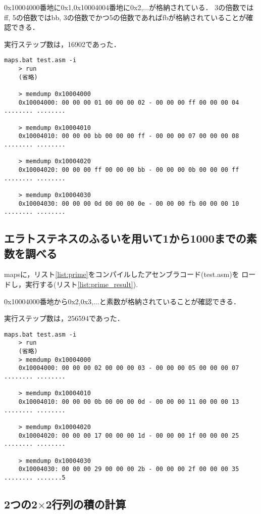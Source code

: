 \documentclass[11pt]{jarticle}
\begin{document}
0x10004000番地に0x1,0x10004004番地に0x2,...が格納されている．
3の倍数ではff, 5の倍数ではbb, 3の倍数でかつ5の倍数であればfbが格納されていることが確認できる．

実行ステップ数は，16902であった．

\begin{lstlisting}[caption=FizzBuzzの結果,label=list:fizzbuzz_result]
    maps.bat test.asm -i
    > run
    (省略)

    > memdump 0x10004000
    0x10004000: 00 00 00 01 00 00 00 02 - 00 00 00 ff 00 00 00 04  ........ ........

    > memdump 0x10004010
    0x10004010: 00 00 00 bb 00 00 00 ff - 00 00 00 07 00 00 00 08  ........ ........

    > memdump 0x10004020
    0x10004020: 00 00 00 ff 00 00 00 bb - 00 00 00 0b 00 00 00 ff  ........ ........

    > memdump 0x10004030
    0x10004030: 00 00 00 0d 00 00 00 0e - 00 00 00 fb 00 00 00 10  ........ ........
\end{lstlisting}

\subsection{エラトステネスのふるいを用いて1から1000までの素数を調べる}

mapsに，リスト\ref{list:prime}をコンパイルしたアセンブラコード(test.asm)を
ロードし，実行する(リスト\ref{list:prime_result}).

0x10004000番地から0x2,0x3,...と素数が格納されていることが確認できる．

実行ステップ数は，256594であった．

\begin{lstlisting}[caption=エラトステネスのふるいの結果,label=list:prime_result]
    maps.bat test.asm -i
    > run
    (省略)
    > memdump 0x10004000
    0x10004000: 00 00 00 02 00 00 00 03 - 00 00 00 05 00 00 00 07  ........ ........
    
    > memdump 0x10004010
    0x10004010: 00 00 00 0b 00 00 00 0d - 00 00 00 11 00 00 00 13  ........ ........
    
    > memdump 0x10004020
    0x10004020: 00 00 00 17 00 00 00 1d - 00 00 00 1f 00 00 00 25  ........ ........
    
    > memdump 0x10004030
    0x10004030: 00 00 00 29 00 00 00 2b - 00 00 00 2f 00 00 00 35  ........ .......5
\end{lstlisting}

\subsection{2つの2$\times$2行列の積の計算}
\end{document}
